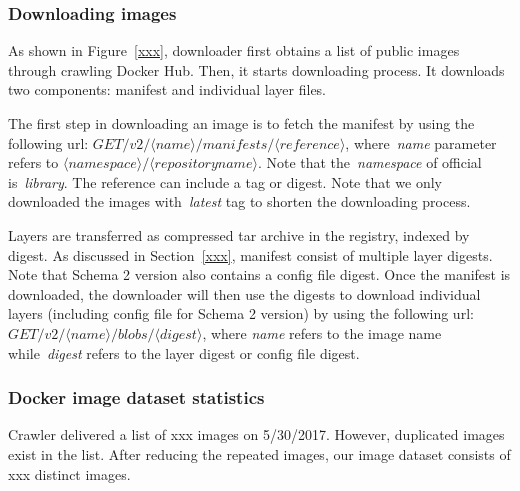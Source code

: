 \subsubsection{Downloading images}

%
As shown in Figure~\ref{xxx}, downloader first obtains a list of public images through crawling Docker Hub.
%
Then, it starts downloading process.
%
It downloads two components: manifest and individual layer files. 



The first step in downloading an image is to fetch the manifest by using the following url: $GET /v2/\langle name \rangle/manifests/\langle reference \rangle$, where~\textit{name} parameter refers to $\langle namespace\rangle/\langle repository name \rangle$.
%
Note that the~\textit{namespace} of official is~\textit{library}.
%
The reference can include a tag or digest.
%
Note that we only downloaded the images with~\textit{latest} tag to shorten the downloading process.
%




Layers are transferred as compressed tar archive in the registry, indexed by digest.
%
%
As discussed in Section~\ref{xxx}, manifest consist of multiple layer digests.
%
Note that Schema 2 version also contains a config file digest.
%
Once the manifest is downloaded, the downloader will then use the digests to download individual layers (including config file for Schema 2 version) by using the following url: $GET /v2/\langle name \rangle/blobs/\langle digest \rangle$, where \textit{name} refers to the image name while~\textit{digest} refers to the layer digest or config file digest.







\subsubsection{Docker image dataset statistics}

%
%
Crawler delivered a list of xxx images on 5/30/2017.
%
However, duplicated images exist in the list.
%
After reducing the repeated images, our image dataset consists of xxx distinct images. 

